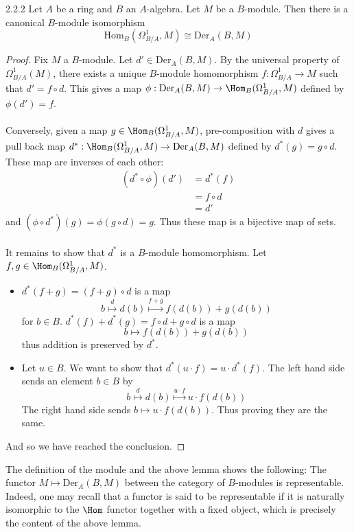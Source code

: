 \documentclass[a4paper]{article}
\begin{document}
\begin{lmm}{}{2.2.2} Let $A$ be a ring and $B$ an $A$-algebra. Let $M$ be a $B$-module. Then there is a canonical $B$-module isomorphism $$\text{Hom}_B(\Omega_{B/A}^1,M)\cong\text{Der}_A(B,M)$$ \tcbline
\begin{proof}
Fix $M$ a $B$-module. Let $d'\in\text{Der}_A(B,M)$. By the universal property of $\Omega_{B/A}^1(M)$, there exists a unique $B$-module homomorphism $f:\Omega_{B/A}^1\to M$ such that $d'=f\circ d$. This gives a map $\phi:\text{Der}_A(B,M)\to\Hom_B(\Omega_{B/A}^1,M)$ defined by $\phi(d')=f$. \\~\\
Conversely, given a map $g\in\Hom_B(\Omega_{B/A}^1,M)$, pre-composition with $d$ gives a pull back map $d^\ast:\Hom_B(\Omega_{B/A}^1,M)\to\text{Der}_A(B,M)$ defined by $d^\ast(g)=g\circ d$. These map are inverses of each other: 
\begin{align*}
(d^\ast\circ\phi)(d')&=d^\ast(f)\\
&=f\circ d\\
&=d'\tag{By universal property}
\end{align*} and 
$(\phi\circ d^\ast)(g)=\phi(g\circ d)=g$. 
Thus these map is a bijective map of sets. \\~\\

It remains to show that $d^\ast$ is a $B$-module homomorphism. Let $f,g\in\Hom_B(\Omega_{B/A}^1,M)$. 
\begin{itemize}
\item $d^\ast(f+g)=(f+g)\circ d$ is a map $$b\overset{d}{\mapsto}d(b)\overset{f+g}{\mapsto}f(d(b))+g(d(b))$$ for $b\in B$. $d^\ast(f)+d^\ast(g)=f\circ d+g\circ d$ is a map $$b\mapsto f(d(b))+g(d(b))$$ thus addition is preserved by $d^\ast$. 
\item Let $u\in B$. We want to show that $d^\ast(u\cdot f)=u\cdot d^\ast(f)$. The left hand side sends an element $b\in B$ by $$b\overset{d}{\mapsto}d(b)\overset{u\cdot f}{\mapsto}u\cdot f(d(b))$$ The right hand side sends $b\mapsto u\cdot f(d(b))$. Thus proving they are the same. 
\end{itemize}
And so we have reached the conclusion. 
\end{proof}
\end{lmm}

The definition of the module and the above lemma shows the following: The functor $M\mapsto\text{Der}_A(B,M)$ between the category of $B$-modules is representable. Indeed, one may recall that a functor is said to be representable if it is naturally isomorphic to the $\Hom$ functor together with a fixed object, which is precisely the content of the above lemma. \\~\\
\end{document}
